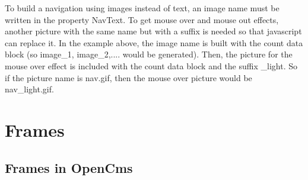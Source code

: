 To build a navigation using images instead of text, an image name must be written in the property
{\name NavText}. To get mouse over and mouse out effects, another picture with the same name but 
with a suffix is needed so that javascript can replace it. In the example above, the 
image name is built with the count data block (so image\_1, image\_2,.... 
would be generated). Then, the picture for the mouse over effect is included with the count
data block and the suffix {\name \_light}. So if the picture 
name is {\name nav.gif}, then the mouse over picture would be nav\_light.gif. \\

\section{Frames}

\subsection{Frames in OpenCms}

